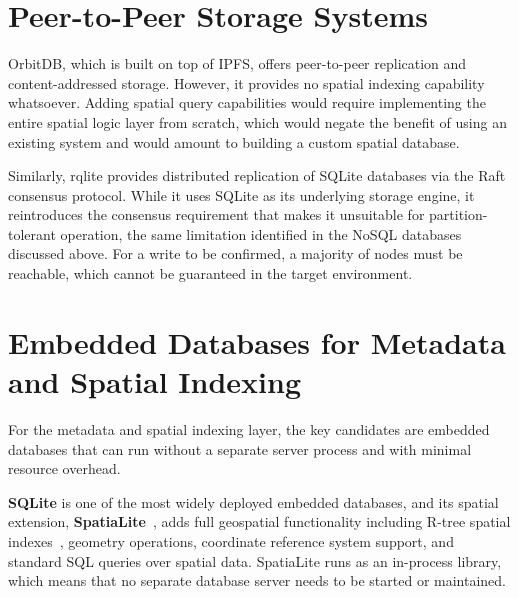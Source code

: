 \section{Peer-to-Peer Storage Systems} \label{sec:p2p-storage}

OrbitDB, which is built on top of IPFS, offers peer-to-peer replication and content-addressed storage. However, it provides no spatial indexing capability whatsoever. Adding spatial query capabilities would require implementing the entire spatial logic layer from scratch, which would negate the benefit of using an existing system and would amount to building a custom spatial database.

Similarly, rqlite provides distributed replication of SQLite databases via the Raft consensus protocol. While it uses SQLite as its underlying storage engine, it reintroduces the consensus requirement that makes it unsuitable for partition-tolerant operation, the same limitation identified in the NoSQL databases discussed above. For a write to be confirmed, a majority of nodes must be reachable, which cannot be guaranteed in the target environment.


\section{Embedded Databases for Metadata and Spatial Indexing} \label{sec:embedded-metadata}

For the metadata and spatial indexing layer, the key candidates are embedded databases that can run without a separate server process and with minimal resource overhead.

\textbf{SQLite} is one of the most widely deployed embedded databases, and its spatial extension, \textbf{SpatiaLite}~\cite{spatialite2024}, adds full geospatial functionality including R-tree spatial indexes~\cite{guttman1984rtrees}, geometry operations, coordinate reference system support, and standard SQL queries over spatial data. SpatiaLite runs as an in-process library, which means that no separate database server needs to be started or maintained.

